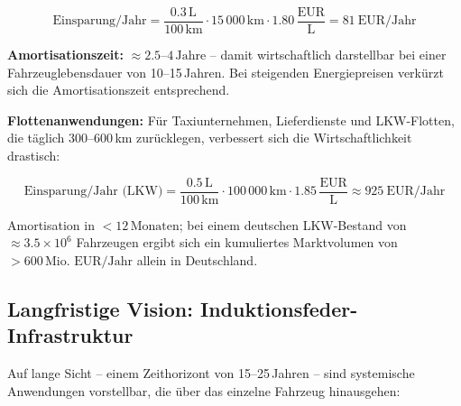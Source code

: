 ﻿\documentclass[12pt, a4paper]{report}
\theoremstyle{definition}
\theoremstyle{remark}
\begin{document}
\begin{equation}
  \text{Einsparung/Jahr} = \frac{0.3\,\text{L}}{100\,\text{km}} \cdot 15\,000\,\text{km}
  \cdot 1.80\,\frac{\text{EUR}}{\text{L}} = \SI{81}{\text{EUR/Jahr}}
  \label{eq:einsparung}
\end{equation}

\textbf{Amortisationszeit:} $\approx 2.5$--$4\,\text{Jahre}$ -- damit wirtschaftlich
darstellbar bei einer Fahrzeuglebensdauer von 10--15\,Jahren. Bei steigenden
Energiepreisen verkürzt sich die Amortisationszeit entsprechend.

\textbf{Flottenanwendungen:} Für Taxiunternehmen, Lieferdienste und
LKW-Flotten, die täglich 300--600\,km zurücklegen, verbessert sich die
Wirtschaftlichkeit drastisch:

\begin{equation}
  \text{Einsparung/Jahr (LKW)} = \frac{0.5\,\text{L}}{100\,\text{km}} \cdot 100\,000\,\text{km}
  \cdot 1.85\,\frac{\text{EUR}}{\text{L}} \approx \SI{925}{\text{EUR/Jahr}}
  \label{eq:einsparung_lkw}
\end{equation}

Amortisation in $< 12\,\text{Monaten}$; bei einem deutschen LKW-Bestand von
$\approx 3.5 \times 10^6$ Fahrzeugen ergibt sich ein kumuliertes
Marktvolumen von $> 600\,\text{Mio.\ EUR/Jahr}$ allein in Deutschland.

\subsection{Langfristige Vision: Induktionsfeder-Infrastruktur}
\label{ssec:ausblick_vision}

Auf lange Sicht -- einem Zeithorizont von 15--25\,Jahren -- sind
systemische Anwendungen vorstellbar, die über das einzelne Fahrzeug hinausgehen:
\end{document}
